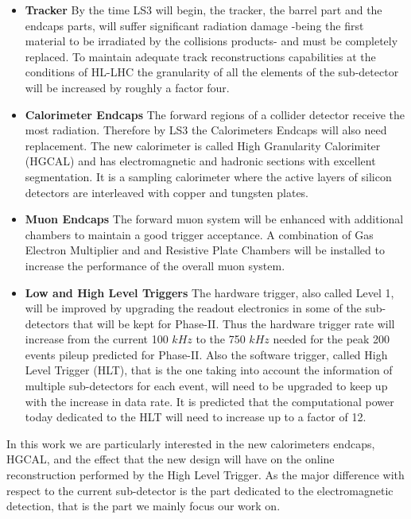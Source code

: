 \begin{itemize}
\item \textbf{Tracker} By the time LS3 will begin, the tracker, the barrel part and the endcaps parts, will suffer significant radiation damage -being the first material to be irradiated by the collisions products- and must be completely replaced. To maintain adequate track reconstructions capabilities at the conditions of HL-LHC the granularity of all the elements of the sub-detector will be increased by roughly a factor four.
\item \textbf{Calorimeter Endcaps} The forward regions of a collider detector receive the most radiation. Therefore by LS3 the Calorimeters Endcaps will also need replacement. The new calorimeter is called High Granularity Calorimiter (HGCAL) and has electromagnetic and hadronic sections with excellent segmentation. It is a sampling calorimeter where the active layers of silicon detectors are interleaved with copper and tungsten plates.
\item \textbf{Muon Endcaps} The forward muon system will be enhanced with additional chambers to maintain a good trigger acceptance. A combination of Gas Electron Multiplier and and Resistive Plate Chambers will be installed to increase the performance of the overall muon system.
\item \textbf{Low and High Level Triggers} The hardware trigger, also called Level 1, will be improved by upgrading the readout electronics in some of the sub-detectors that will be kept for Phase-II. Thus the hardware trigger rate will increase from the current 100 $\unit{kHz}$ to the 750 $\unit{kHz}$ needed for the peak 200 events pileup predicted for Phase-II. Also the software trigger, called High Level Trigger (HLT), that is the one taking into account the information of multiple sub-detectors for each event, will need to be upgraded to keep up with the increase in data rate. It is predicted that the computational power today dedicated to the HLT will need to increase up to a factor of 12.
\end{itemize}

In this work we are particularly interested in the new calorimeters endcaps, HGCAL, and the effect that the new design will have on the online reconstruction performed by the High Level Trigger. As the major difference with respect to the current sub-detector is the part dedicated to the electromagnetic detection, that is the part we mainly focus our work on.

